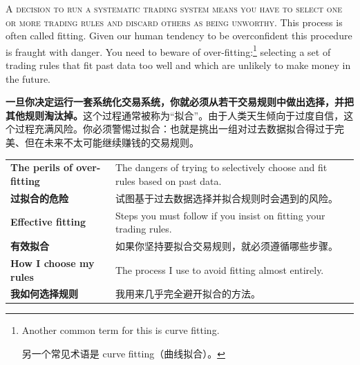 

\begin{englishblock} \noindent\textsc{A decision to run a systematic trading system means you have to select one or more trading rules and discard others as being unworthy.} This process is often called fitting. Given our human tendency to be overconfident this procedure is fraught with danger. You need to beware of over-fitting:\footnote{Another common term for this is curve fitting. \par 另一个常见术语是 curve fitting（曲线拟合）。} selecting a set of trading rules that fit past data too well and which are unlikely to make money in the future. \end{englishblock}

\begin{chineseblock} \noindent\textbf{一旦你决定运行一套系统化交易系统，你就必须从若干交易规则中做出选择，并把其他规则淘汰掉。}这个过程通常被称为“拟合”。由于人类天生倾向于过度自信，这个过程充满风险。你必须警惕过拟合：也就是挑出一组对过去数据拟合得过于完美、但在未来不太可能继续赚钱的交易规则。\end{chineseblock}


\begin{bilingualtableblock} \begin{tabularx}{\textwidth}{@{} L{0.34\textwidth} Y@{}}\textbf{The perils of over-fitting} & The dangers of trying to selectively choose and fit rules based on past data. \\

\textbf{过拟合的危险} & 试图基于过去数据选择并拟合规则时会遇到的风险。 \\
\textbf{Effective fitting} & Steps you must follow if you insist on fitting your trading rules. \\
\textbf{有效拟合} & 如果你坚持要拟合交易规则，就必须遵循哪些步骤。 \\
\textbf{How I choose my rules} & The process I use to avoid fitting almost entirely. \\
\textbf{我如何选择规则} & 我用来几乎完全避开拟合的方法。 \\
\end{tabularx}
\end{bilingualtableblock}


